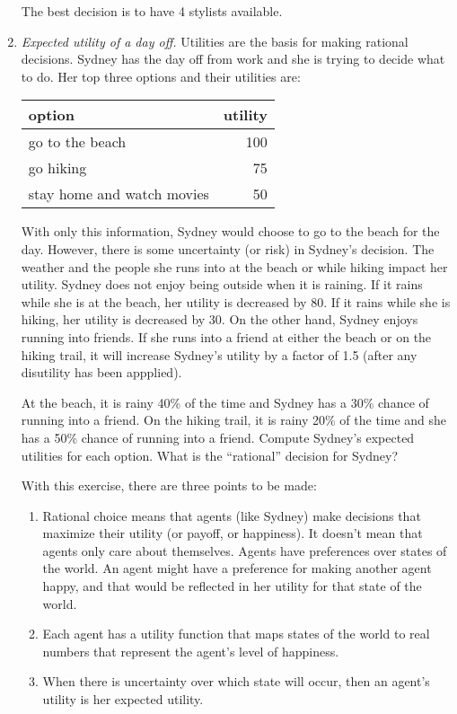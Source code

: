 \begin{enumerate}
\begin{solution}
The best decision is to have 4 stylists available.
\end{solution}

\item \emph{Expected utility of a day off.}  Utilities are the basis
  for making rational decisions.  Sydney has the day off from work and
  she is trying to decide what to do. Her top three options and their
  utilities are:

\begin{tabular}{lr}
  option & utility \\ \hline
  go to the beach & 100\\
  go hiking & 75\\
  stay home and watch movies & 50
\end{tabular}

With only this information, Sydney would choose to go to the beach for
the day. However, there is some uncertainty (or risk) in Sydney's
decision. The weather and the people she runs into at the beach or
while hiking impact her utility.  Sydney does not enjoy being outside
when it is raining.  If it rains while she is at the beach, her
utility is decreased by 80.  If it rains while she is hiking, her
utility is decreased by 30.  On the other hand, Sydney enjoys running
into friends. If she runs into a friend at either the beach or on the
hiking trail, it will increase Sydney's utility by a factor of 1.5
(after any disutility has been appplied).

At the beach, it is rainy 40\% of the time and Sydney has a 30\%
chance of running into a friend.  On the hiking trail, it is rainy
20\% of the time and she has a 50\% chance of running into a friend.
Compute Sydney's expected utilities for each option. What is the
``rational'' decision for Sydney?

With this exercise, there are three points to be made:
\begin{enumerate}
\item Rational choice means that agents (like Sydney) make decisions 
    that maximize their utility (or payoff, or happiness). It doesn't 
    mean that agents only care about themselves. Agents have 
    preferences over states of the world. An agent might have a preference 
    for making another agent happy, and that would be reflected in her 
    utility for that state of the world.
\item Each agent has a utility function that maps states of the world
    to real numbers that represent the agent's level of happiness.
\item When there is uncertainty over which state will occur, then
    an agent's utility is her expected utility.
\end{enumerate}


\end{enumerate}
